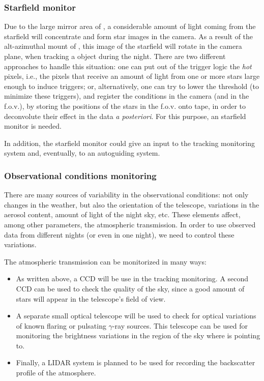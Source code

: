 \subsubsection{Starfield monitor}
%
Due to the large mirror area of \MAGIC, a considerable amount of light
coming from the starfield will concentrate and form star images in the
camera. As a result of the alt-azimuthal mount of \MAGIC, this image
of the starfield will rotate in the camera plane, when tracking a
object during the night. There are two different approaches to handle
this situation: one can put out of the trigger logic the \emph{hot}
pixels, i.e., the pixels that receive an amount of light from one or
more stars large enough to induce triggers; or, alternatively, one can
try to lower the threshold (to minimize these triggers), and register
the conditions in the camera (and in the f.o.v.), by storing the
positions of the stars in the f.o.v. onto tape, in order to
deconvolute their effect in the data \emph{a posteriori}. For this
purpose, an starfield monitor is needed.

In addition, the starfield monitor could give an input to the tracking
monitoring system and, eventually, to an autoguiding system.

\subsubsection{Observational conditions monitoring}
%
There are many sources of variability in the observational conditions:
not only changes in the weather, but also the orientation of the
telescope, variations in the aerosol content, amount of light of the
night sky, etc.  These elements affect, among other parameters, the
atmospheric transmission. In order to use observed data from different
nights (or even in one night), we need to control these variations.

The atmospheric transmission can be monitorized in many ways:
\begin{itemize}
\item As written above, a CCD will be use in the tracking monitoring.
  A second CCD can be used to check the quality of the sky, since a
  good amount of stars will appear in the telescope's field of view.

\item A separate small optical telescope will be used to check for
  optical variations of known flaring or pulsating $\gamma$-ray
  sources. This telescope can be used for monitoring the brightness
  variations in the region of the sky where \MAGIC is pointing to.

\item Finally, a LIDAR system is planned to be used for recording the
  backscatter profile of the atmosphere.
\end{itemize}

